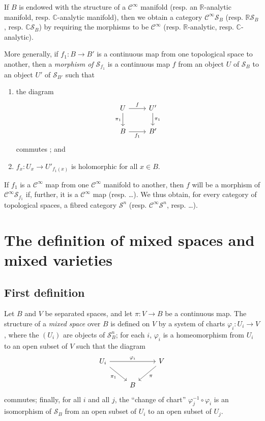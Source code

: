 \documentclass{article}
\theoremstyle{plain}
\theoremstyle{definition}
\newcommand{\RR}{\mathbb{R}}
\newcommand{\CC}{\mathbb{C}}
\newcommand{\oldpage}[1]{\marginpar{\footnotesize$\Big\vert$ \textit{p.~#1}}}
\begin{document}
If $B$ is endowed with the structure of a $\mathscr{C}^\infty$ manifold (resp. an $\RR$-analytic manifold, resp. $\CC$-analytic manifold), then we obtain a category $\mathscr{C}^\infty\mathscr{S}_B$ (resp. $\RR\mathscr{S}_B$, resp. $\CC\mathscr{S}_B$) by requiring the morphisms to be $\mathscr{C}^\infty$ (resp. $\RR$-analytic, resp. $\CC$-analytic).

More generally, if $f_1\colon B\to B'$ is a continuous map from one topological space to another, then a \emph{morphism of $\mathscr{S}_{f_1}$} is a continuous map $f$ from an object $U$ of $\mathscr{S}_B$ to an object $U'$ of $\mathscr{S}_{B'}$ such that
\begin{enumerate}
  \item the diagram
    \[
      \begin{tikzcd}
        U \rar["f"] \dar[swap,"\pi_1"]
        & U' \dar["\pi_1"]
      \\B \rar[swap,"f_1"]
        & B'
      \end{tikzcd}
    \]
    commutes ; and
  \item $f_x\colon U_x\to U'_{f_1(x)}$ is holomorphic for all $x\in B$.
\end{enumerate}

\oldpage{2-02}
If $f_1$ is a $\mathscr{C}^\infty$ map from one $\mathscr{C}^\infty$ manifold to another, then $f$ will be a morphism of $\mathscr{C}^\infty\mathscr{S}_{f_1}$ if, further, it is a $\mathscr{C}^\infty$ map (resp. \ldots).
We thus obtain, for every category of topological spaces, a fibred category $\mathscr{S}^n$ (resp. $\mathscr{C}^\infty\mathscr{S}^n$, resp. \ldots).


\section{The definition of mixed spaces and mixed varieties}
\label{II}

\subsection{First definition}
\label{II.1}

Let $B$ and $V$ be separated spaces, and let $\pi\colon V\to B$ be a continuous map.
The structure of a \emph{mixed space} over $B$ is defined on $V$ by a system of charts $\varphi_i\colon U_i\to V$, where the $(U_i)$ are objects of $\mathscr{S}_B^n$;
for each $i$, $\varphi_i$ is a homeomorphism from $U_i$ to an open subset of $V$ such that the diagram
\[
  \begin{tikzcd}
    U_i \ar[rr,"\varphi_i"] \ar[dr,swap,"\pi_1"]
    && V \ar[dl,"\pi"]
  \\&B&
  \end{tikzcd}
\]
commutes;
finally, for all $i$ and all $j$, the ``change of chart'' $\varphi_j^{-1}\circ\varphi_i$ is an isomorphism of $\mathscr{S}_B$ from an open subset of $U_i$ to an open subset of $U_j$.
\end{document}
